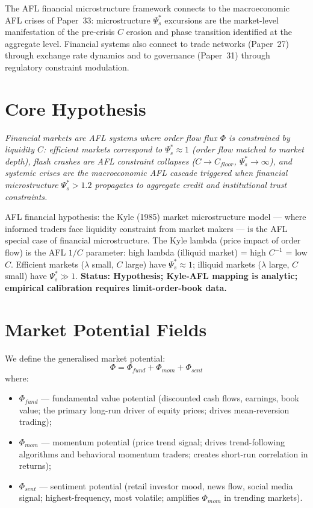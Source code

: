 \documentclass[11pt]{article}
\begin{document}
The AFL financial microstructure framework connects to the macroeconomic AFL crises of Paper~33:
microstructure $\Psi_s^*$ excursions are the market-level manifestation of the pre-crisis $C$
erosion and phase transition identified at the aggregate level. Financial systems also connect
to trade networks (Paper~27) through exchange rate dynamics and to governance (Paper~31) through
regulatory constraint modulation.

\section{Core Hypothesis}

\begin{center}
\textit{
Financial markets are AFL systems where order flow flux $\Phi$ is constrained by liquidity
$C$: efficient markets correspond to $\Psi_s^* \approx 1$ (order flow matched to market depth),
flash crashes are AFL constraint collapses ($C \to C_{floor}$, $\Psi_s^* \to \infty$), and
systemic crises are the macroeconomic AFL cascade triggered when financial microstructure
$\Psi_s^* > 1.2$ propagates to aggregate credit and institutional trust constraints.
}
\end{center}

AFL financial hypothesis: the Kyle (1985) market microstructure model --- where informed traders
face liquidity constraint from market makers --- is the AFL special case of financial microstructure.
The Kyle lambda (price impact of order flow) is the AFL $1/C$ parameter: high lambda (illiquid
market) = high $C^{-1}$ = low $C$. Efficient markets ($\lambda$ small, $C$ large) have $\Psi_s^*
\approx 1$; illiquid markets ($\lambda$ large, $C$ small) have $\Psi_s^* \gg 1$.
\textbf{Status: Hypothesis; Kyle-AFL mapping is analytic; empirical calibration requires
limit-order-book data.}

\section{Market Potential Fields}

We define the generalised market potential:
\begin{equation}
\Phi = \Phi_{fund} + \Phi_{mom} + \Phi_{sent}
\end{equation}
where:
\begin{itemize}
    \item $\Phi_{fund}$ --- fundamental value potential (discounted cash flows, earnings, book value;
          the primary long-run driver of equity prices; drives mean-reversion trading);
    \item $\Phi_{mom}$ --- momentum potential (price trend signal; drives trend-following algorithms
          and behavioral momentum traders; creates short-run correlation in returns);
    \item $\Phi_{sent}$ --- sentiment potential (retail investor mood, news flow, social media
          signal; highest-frequency, most volatile; amplifies $\Phi_{mom}$ in trending markets).
\end{itemize}
\end{document}
